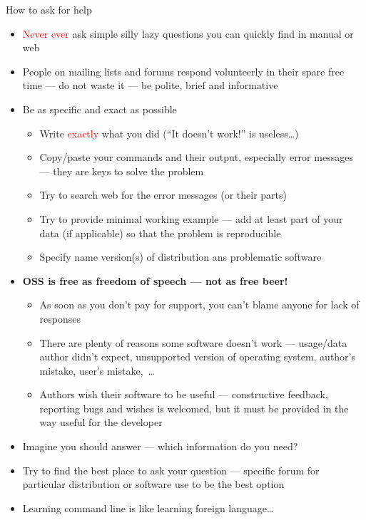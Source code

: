 \documentclass[compress, ucs, xelatex, 11pt, xcolor=svgnames,
  hyperref={
    bookmarks=true,
    unicode=true,
    colorlinks=true,
    pdftitle={Linux, command line and MetaCentrum},
    plainpages=false,
    pdfauthor={Vojtech Zeisek},
    pdfsubject={Course about use of Linux command line, writing shell scripts and using MetaCentrum of CESNET},
    pdfcreator={XeLaTeX},
    pdfkeywords={Linux, GNU, BASH, shell, command line, MetaCentrum},
    linkcolor=DarkRed,
    anchorcolor=DarkBlue,
    citecolor=Indigo,
    filecolor=NavyBlue,
    menucolor=DarkMagenta,
    urlcolor=DarkBlue,
    pdftex},
  url={hyphens, lowtilde} %
  ]{beamer}
\renewcommand{\alert}[1]{\textcolor{red}{#1}}
\begin{document}
\begin{frame}[allowframebreaks]{How to ask for help} %
  \label{howtoask}
  \begin{itemize}
    \item \alert{Never ever} ask simple silly lazy questions you can quickly find in manual or web
    \item People on mailing lists and forums respond volunteerly in their spare free time --- do not waste it --- be polite, brief and informative
    \item Be as specific and exact as possible
    \begin{itemize}
      \item Write \alert{exactly} what you did (``It doesn't work!'' is useless\ldots)
      \item Copy/paste your commands and their output, especially error messages --- they are keys to solve the problem
      \item Try to search web for the error messages (or their parts)
      \item Try to provide minimal working example --- add at least part of your data (if applicable) so that the problem is reproducible
      \item Specify name version(s) of distribution ans problematic software
    \end{itemize}
    \item \textbf{OSS is free as freedom of speech --- not as free beer!}
    \begin{itemize}
      \item As soon as you don't pay for support, you can't blame anyone for lack of responses
      \item There are plenty of reasons some software doesn't work --- usage/data author didn't expect, unsupported version of operating system, author's mistake, user's mistake,~\ldots
      \item Authors wish their software to be useful --- constructive feedback, reporting bugs and wishes is welcomed, but it must be provided in the way useful for the developer
    \end{itemize}
    \item Imagine you should answer --- which information do you need?
    \item Try to find the best place to ask your question --- specific forum for particular distribution or software use to be the best option
    \item Learning command line is like learning foreign language\ldots
  \end{itemize}
\end{frame}
\end{document}
